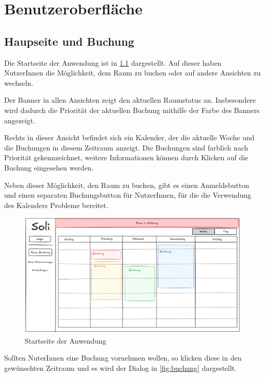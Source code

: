 
\chapter{Benutzeroberfläche}
\label{chap:ui}

\section{Haupseite und Buchung}

Die Startseite der Anwendung ist in \ref{fig:startseite} dargestellt.
Auf dieser haben NutzerInnen die Möglichkeit, dem Raum zu buchen oder auf andere Ansichten zu wechseln.

Der Banner in allen Ansichten zeigt den aktuellen Raumstatus an.
Insbesondere wird dadurch die Priorität der aktuellen Buchung mithilfe der Farbe des Banners angezeigt.

Rechts in dieser Ansicht befindet sich ein Kalender, der die aktuelle Woche und die Buchungen in diesem Zeitraum anzeigt.
Die Buchungen sind farblich nach Priorität gekennzeichnet, weitere Informationen können durch Klicken auf die Buchung eingesehen werden.

Neben dieser Möglichkeit, den Raum zu buchen, gibt es einen Anmeldebutton und einen separaten Buchungsbutton für NutzerInnen,
für die die Verwendung des Kalenders Probleme bereitet.
\begin{figure}[ht]
    \centering
    \includegraphics[scale=0.15]{figures/ui/startseite}
    \caption{Startseite der Anwendung}
    \label{fig:startseite}
\end{figure}
\clearpage

Sollten NuterInnen eine Buchung vornehmen wollen, so klicken diese in den gewünschten Zeitraum
und es wird der Dialog in \ref{fig:buchung} dargestellt.


